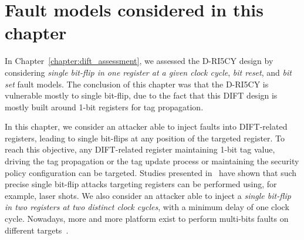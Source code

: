 \section{Fault models considered in this chapter}
In Chapter~\ref{chapter:dift_assessment}, we assessed the D-RI5CY design by considering \textit{single bit-flip in one register at a given clock cycle}, \textit{bit reset}, and \textit{bit set} fault models. The conclusion of this chapter was that the D-RI5CY is vulnerable mostly to single bit-flip, due to the fact that this DIFT design is mostly built around 1-bit registers for tag propagation.

In this chapter, we consider an attacker able to inject faults into DIFT-related registers, leading to single bit-flips at any position of the targeted register. To reach this objective, any DIFT-related register maintaining 1-bit tag value, driving the tag propagation or the tag update process or maintaining the security policy configuration can be targeted. Studies presented in~\cite{ZDCRT-12-dcis,CLFT-14-cosade} have shown that such precise single bit-flip attacks targeting registers can be performed using, for example, laser shots. We also consider an attacker able to inject a \textit{single bit-flip in two registers at two distinct clock cycles}, with a minimum delay of one clock cycle. Nowadays, more and more platform exist to perform multi-bits faults on different targets~\cite{alphanov-doubleLFI,alphanov-fourLFI}.

